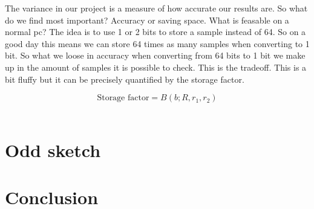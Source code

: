 \documentclass[a4paper,11pt]{article}
\begin{document}
The variance in our project is a measure of how accurate our results are. So what do we find most important? Accuracy or saving space. What is feasable on a normal pc? The idea is to use 1 or 2 bits to store a sample instead of 64. So on a good day this means we can store 64 times as many samples when converting to 1 bit. So what we loose in accuracy when converting from 64 bits to 1 bit we make up in the amount of samples it is possible to check. This is the tradeoff. This is a bit fluffy but it can be precisely quantified by the storage factor. 

\begin{equation}
    \text {Storage factor} = B(b;R,r_1,r_2)
\end{equation}\\

\section{Odd sketch}

\section{Conclusion}
\newpage

\end{document}
